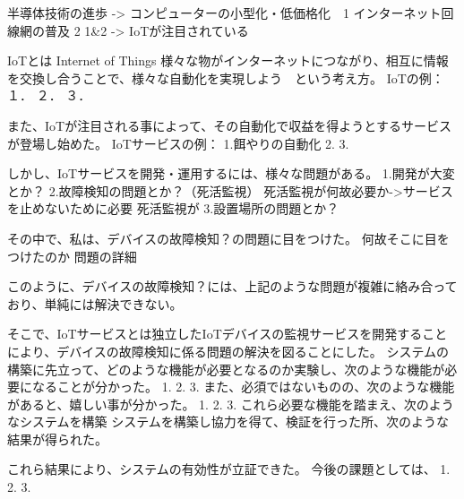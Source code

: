  半導体技術の進歩 -> コンピューターの小型化・低価格化　1
 インターネット回線網の普及 2
 1&2 -> IoTが注目されている

 IoTとは
 Internet of Things
 様々な物がインターネットにつながり、相互に情報を交換し合うことで、様々な自動化を実現しよう　という考え方。
 IoTの例：
１．
２．
３．

 また、IoTが注目される事によって、その自動化で収益を得ようとするサービスが登場し始めた。
 IoTサービスの例：
 1.餌やりの自動化
 2.
 3.

 しかし、IoTサービスを開発・運用するには、様々な問題がある。
 1.開発が大変とか？
 2.故障検知の問題とか？（死活監視）
	死活監視が何故必要か->サービスを止めないために必要
	死活監視が
 3.設置場所の問題とか？

その中で、私は、デバイスの故障検知？の問題に目をつけた。
何故そこに目をつけたのか
問題の詳細

このように、デバイスの故障検知？には、上記のような問題が複雑に絡み合っており、単純には解決できない。

そこで、IoTサービスとは独立したIoTデバイスの監視サービスを開発することにより、デバイスの故障検知に係る問題の解決を図ることにした。
システムの構築に先立って、どのような機能が必要となるのか実験し、次のような機能が必要になることが分かった。
1.
2.
3.
また、必須ではないものの、次のような機能があると、嬉しい事が分かった。
1.
2.
3.
これら必要な機能を踏まえ、次のようなシステムを構築
システムを構築し協力を得て、検証を行った所、次のような結果が得られた。

これら結果により、システムの有効性が立証できた。
今後の課題としては、
1.
2.
3.
